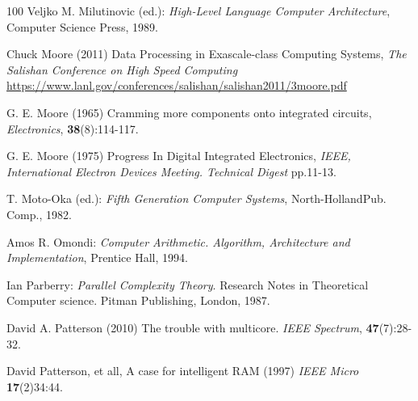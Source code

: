 \begin{thebibliography}{100}
 Veljko M. Milutinovic (ed.): {\em High-Level Language Computer Architecture}, Computer Science Press, 1989.




 Chuck Moore (2011) Data Processing in Exascale-class Computing Systems, {\em The Salishan Conference on
High Speed Computing} \url{https://www.lanl.gov/conferences/salishan/salishan2011/3moore.pdf}


 G. E. Moore (1965) Cramming more components onto integrated circuits, {\em Electronics}, {\bf 38}(8):114-117. %

 G. E. Moore (1975) Progress In Digital Integrated Electronics,  {\em IEEE, International Electron Devices Meeting. Technical Digest} pp.11-13.


 T. Moto-Oka (ed.): {\em Fifth Generation Computer Systems}, North-HollandPub. Comp., 1982.


 Amos R. Omondi: {\em Computer Arithmetic. Algorithm, Architecture and Implementation}, Prentice Hall, 1994.


 Ian Parberry: {\em Parallel Complexity Theory}. Research Notes in Theoretical Computer science. Pitman Publishing, London, 1987.


 David A. Patterson (2010) The trouble with multicore. {\em IEEE Spectrum}, {\bf 47}(7):28-32.


 David Patterson, et all, A case for intelligent RAM (1997) {\em  IEEE Micro} {\bf 17}(2)34:44.


\end{thebibliography}
